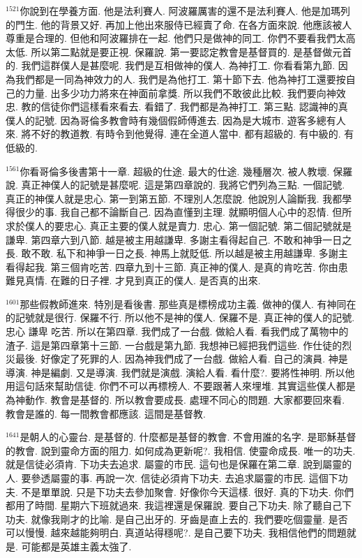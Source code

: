 \documentclass{book}
\begin{document}
$^{1521}$你說到在學養方面.
他是法利賽人.
阿波羅厲害的還不是法利賽人.
他是加瑪列的門生.
他的背景又好.
再加上他出來服侍已經賣了命.
在各方面來說.
他應該被人尊重是合理的.
但他和阿波羅排在一起.
他們只是做神的同工.
你們不要看我們太高太低.
所以第二點就是要正視.
保羅說.
第一要認定教會是基督買的.
是基督做元首的.
我們這群僕人是甚麼呢.
我們是互相做神的僕人.
為神打工.
你看看第九節.
因為我們都是一同為神效力的人.
我們是為他打工.
第十節下去.
他為神打工還要按自己的力量.
出多少功力將來在神面前拿獎.
所以我們不敢彼此比較.
我們要向神效忠.
教的信徒你們這樣看來看去.
看錯了.
我們都是為神打工.
第三點.
認識神的真僕人的記號.
因為哥倫多教會時有幾個假師傅進去.
因為是大城市.
遊客多總有人來.
將不好的教道教.
有時令到他覺得.
連在全道人當中.
都有超級的.
有中級的.
有低級的.

$^{1561}$你看哥倫多後書第十一章.
超級的仕途.
最大的仕途.
幾種層次.
被人教壞.
保羅說.
真正神僕人的記號是甚麼呢.
這是第四章說的.
我將它們列為三點.
一個記號.
真正的神僕人就是忠心.
第一到第五節.
不理別人怎麼說.
他說別人論斷我.
我都學得很少的事.
我自己都不論斷自己.
因為直懂到主理.
就顯明個人心中的忍情.
但所求於僕人的要忠心.
真正主要的僕人就是賣力.
忠心.
第一個記號.
第二個記號就是謙卑.
第四章六到八節.
越是被主用越謙卑.
多謝主看得起自己.
不敢和神爭一日之長.
敢不敢.
私下和神爭一日之長.
神馬上就貶低.
所以越是被主用越謙卑.
多謝主看得起我.
第三個肯吃苦.
四章九到十三節.
真正神的僕人.
是真的肯吃苦.
你由患難見真情.
在難的日子裡.
才見到真正的僕人.
是否真的出來.

$^{1601}$那些假教師進來.
特別是看後書.
那些真是標榜成功主義.
做神的僕人.
有神同在的記號就是很行.
保羅不行.
所以他不是神的僕人.
保羅不是.
真正神的僕人的記號.
忠心 謙卑 吃苦.
所以在第四章.
我們成了一台戲.
做給人看.
看我們成了萬物中的渣子.
這是第四章第十三節.
一台戲是第九節.
我想神已經把我們這些.
作仕徒的烈災最後.
好像定了死罪的人.
因為神我們成了一台戲.
做給人看.
自己的演員.
神是導演.
神是編劇.
又是導演.
我們就是演戲.
演給人看.
看什麼?.
要將性神明.
所以他用這句話來幫助信徒.
你們不可以再標榜人.
不要跟著人來埋堆.
其實這些僕人都是為神動作.
教會是基督的.
所以教會要成長.
處理不同心的問題.
大家都要回來看.
教會是誰的.
每一間教會都應該.
這間是基督教.

$^{1641}$是朝人的心靈台.
是基督的.
什麼都是基督的教會.
不會用誰的名字.
是耶穌基督的教會.
說到靈命方面的阻力.
如何成為更新呢?.
我相信.
使靈命成長.
唯一的功夫.
就是信徒必須肯.
下功夫去追求.
屬靈的市民.
這句也是保羅在第二章.
說到屬靈的人.
要參透屬靈的事.
再說一次.
信徒必須肯下功夫.
去追求屬靈的市民.
這個下功夫.
不是單單說.
只是下功夫去參加聚會.
好像你今天這樣.
很好.
真的下功夫.
你們都用了時間.
星期六下班就過來.
我這裡還是保羅說.
要自己下功夫.
除了聽自己下功夫.
就像我剛才的比喻.
是自己出牙的.
牙齒是直上去的.
我們要吃個靈量.
是否可以慢慢.
越來越能夠明白.
真道站得穩呢?.
是自己要下功夫.
我相信他們的問題就是.
可能都是英雄主義太強了.
\end{document}
